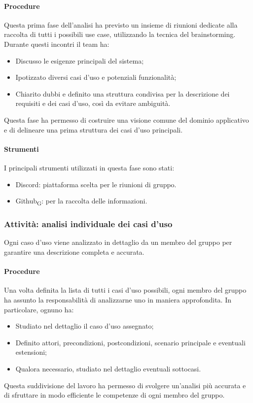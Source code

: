 \documentclass[11pt,a4paper]{article}
\newcommand{\gls}[1]{#1\textsubscript{G}}
\begin{document}
\paragraph{Procedure}
Questa prima fase dell’analisi ha previsto un insieme di riunioni dedicate alla raccolta di tutti i possibili use case, utilizzando la tecnica del brainstorming. Durante questi incontri il team ha:
\begin{itemize}
\item Discusso le esigenze principali del sistema;
\item Ipotizzato diversi casi d’uso e potenziali funzionalità;
\item Chiarito dubbi e definito una struttura condivisa per la descrizione dei requisiti e dei casi d’uso, così da evitare ambiguità.
\end{itemize}
Questa fase ha permesso di costruire una visione comune del dominio applicativo e di delineare una prima struttura dei casi d’uso principali.

\paragraph{Strumenti}
I principali strumenti utilizzati in questa fase sono stati:
\begin{itemize}
\item Discord: piattaforma scelta per le riunioni di gruppo.
\item \gls{Github}: per la raccolta delle informazioni.
\end{itemize}

\subsubsection{Attività: analisi individuale dei casi d'uso}
Ogni caso d’uso viene analizzato in dettaglio da un membro del gruppo per garantire una descrizione completa e accurata.

\paragraph{Procedure}
Una volta definita la lista di tutti i casi d’uso possibili, ogni membro del gruppo ha assunto la responsabilità di analizzarne uno in maniera approfondita. In particolare, ognuno ha:
\begin{itemize}
\item Studiato nel dettaglio il caso d’uso assegnato;
\item Definito attori, precondizioni, postcondizioni, scenario principale e eventuali estensioni;
\item Qualora necessario, studiato nel dettaglio eventuali sottocasi.
\end{itemize}
Questa suddivisione del lavoro ha permesso di svolgere un’analisi più accurata e di sfruttare in modo efficiente le competenze di ogni membro del gruppo.
\end{document}
